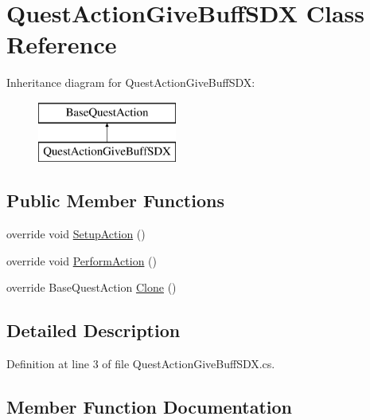 \hypertarget{class_quest_action_give_buff_s_d_x}{}\section{Quest\+Action\+Give\+Buff\+S\+DX Class Reference}
\label{class_quest_action_give_buff_s_d_x}
Inheritance diagram for Quest\+Action\+Give\+Buff\+S\+DX\+:\begin{figure}[H]
\begin{center}
\leavevmode
\includegraphics[height=2.000000cm]{class_quest_action_give_buff_s_d_x}
\end{center}
\end{figure}
\subsection*{Public Member Functions}
\begin{DoxyCompactItemize}
\item 
override void \mbox{\hyperlink{class_quest_action_give_buff_s_d_x_ac8a945f1dbf6614856c5d9f02a76d20b}{Setup\+Action}} ()
\item 
override void \mbox{\hyperlink{class_quest_action_give_buff_s_d_x_af255a6a4bd5e446371d231c776413ce0}{Perform\+Action}} ()
\item 
override Base\+Quest\+Action \mbox{\hyperlink{class_quest_action_give_buff_s_d_x_ab71ede5cd8e876a5eb1bfe3683a0187b}{Clone}} ()
\end{DoxyCompactItemize}


\subsection{Detailed Description}


Definition at line 3 of file Quest\+Action\+Give\+Buff\+S\+D\+X.\+cs.



\subsection{Member Function Documentation}
\mbox{\label{class_quest_action_give_buff_s_d_x_ab71ede5cd8e876a5eb1bfe3683a0187b}} 
